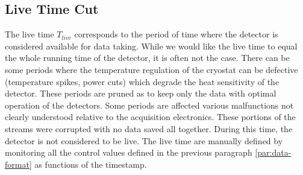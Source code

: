 

\subsection{Live Time Cut}
\label{par:live-time-cut}

%
%
%

The live time $T_{live}$ corresponds to the period of time where the detector is considered available for data taking. While we would like the live time to equal the whole running time of the detector, it is often not the case. There can be some periods where the temperature regulation of the cryostat can be defective (temperature spikes, power cuts) which degrade the heat sensitivity of the detector. These periods are pruned as to keep only the data with optimal operation of the detectors. Some periods are affected various malfunctions not clearly understood relative to the acquisition electronics. These portions of the streams were corrupted with no data saved all together. During this time, the detector is not considered to be live. The live time are manually defined by monitoring all the control values defined in the previous paragraph \ref{par:data-format} as functions of the timestamp.

